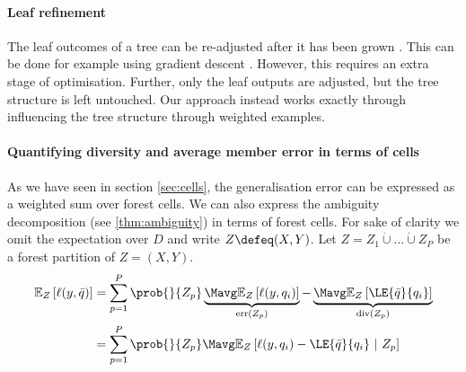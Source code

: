 \documentclass[
    a4paper, %
	fontsize=10pt, %
	twoside=false, %
]{kaobook}
\begin{document}
\paragraph{Leaf refinement} The leaf outcomes of a tree can be re-adjusted after it has been grown \cite{others}. This can be done for example using gradient descent \cite{buschj-negative-correlation-forests}. However, this requires an extra stage of optimisation. Further, only the leaf outputs are adjusted, but the tree structure is left untouched. Our approach instead works exactly through influencing the tree structure through weighted examples.

\paragraph{Quantifying diversity and average member error in terms of cells} As we have seen in section \ref{sec:cells}, the generalisation error can be expressed as a weighted sum over forest cells. 
We can also express the ambiguity decomposition (see \ref{thm:ambiguity}) in terms of forest cells.
For sake of clarity we omit the expectation over $D$ and write $Z \defeq (X,Y)$.  Let
$Z = Z_{1} \dot\cup \dots \dot\cup Z_{P}$ be a forest partition of $Z=(X,Y)$.
\begin{align*}
\mathbb{E}_{Z}\left[ \ell(y, \bar{q}) \right]  &= \sum_{p=1}^P \prob{}{Z_{p}}  
\underbrace{
\Mavg \mathbb{E}_{Z}\left[ \ell(y,q_{i})  \right] 
 }_{\text{err}(Z_p) }
 -  
 \underbrace{
\Mavg \mathbb{E}_{Z}\left[ \LE{\bar{q}}{q_{i}} \right]   
}_{\text{div}(Z_p) } 
\\
&= \sum_{p=1}^P \prob{}{Z_{p}} \Mavg \mathbb{E}_{Z}\left[ \ell(y,q_{i}) - \LE{\bar{q}}{q_{i}} ~|~ Z_p \right] 
\end{align*}
\end{document}
